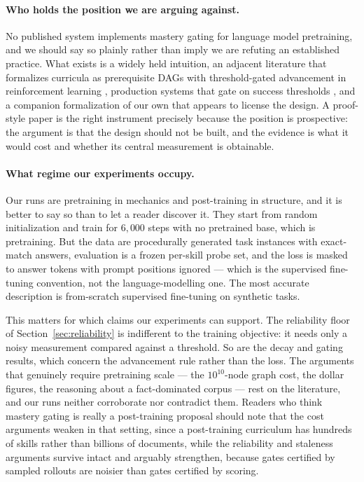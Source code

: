 \documentclass[11pt]{article}
\theoremstyle{plain}
\theoremstyle{definition}
\theoremstyle{remark}
\begin{document}
\paragraph{Who holds the position we are arguing against.} No published system
implements mastery gating for language model pretraining, and we should say so
plainly rather than imply we are refuting an established practice. What exists is
a widely held intuition, an adjacent literature that formalizes curricula as
prerequisite DAGs with threshold-gated advancement in reinforcement learning
\citep{narvekar2020,svetlik2017}, production systems that gate
on success thresholds \citep{akkaya2019,openended2021xland}, and a
companion formalization of our own that appears to license the design. A
proof-style paper is the right instrument precisely because the position is
prospective: the argument is that the design should not be built, and the
evidence is what it would cost and whether its central measurement is
obtainable.

\paragraph{What regime our experiments occupy.} Our runs are pretraining in
mechanics and post-training in structure, and it is better to say so than to let
a reader discover it. They start from random initialization and train for
$6{,}000$ steps with no pretrained base, which is pretraining. But the data are
procedurally generated task instances with exact-match answers, evaluation is a
frozen per-skill probe set, and the loss is masked to answer tokens with prompt
positions ignored --- which is the supervised fine-tuning convention, not the
language-modelling one. The most accurate description is from-scratch supervised
fine-tuning on synthetic tasks.

This matters for which claims our experiments can support. The reliability floor
of Section~\ref{sec:reliability} is indifferent to the training objective: it
needs only a noisy measurement compared against a threshold. So are the decay and
gating results, which concern the advancement rule rather than the loss. The
arguments that genuinely require pretraining scale --- the $10^{10}$-node graph
cost, the dollar figures, the reasoning about a fact-dominated corpus --- rest on
the literature, and our runs neither corroborate nor contradict them. Readers who
think mastery gating is really a post-training proposal should note that the
cost arguments weaken in that setting, since a post-training curriculum has
hundreds of skills rather than billions of documents, while the reliability and
staleness arguments survive intact and arguably strengthen, because gates
certified by sampled rollouts are noisier than gates certified by scoring.
\end{document}
